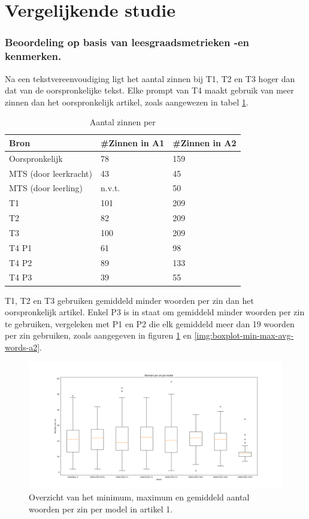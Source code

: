 \section{Vergelijkende studie}

\subsubsection{Beoordeling op basis van leesgraadsmetrieken -en kenmerken.}

Na een tekstvereenvoudiging ligt het aantal zinnen bij T1, T2 en T3 hoger dan dat van de oorspronkelijke tekst. Elke prompt van T4 maakt gebruik van meer zinnen dan het oorspronkelijk artikel, zoals aangewezen in tabel \ref{table:resultaten-aantal-woorden}.

\begin{table}[h]
	\centering
	\begin{tabular}{ | m{3cm} | m{3cm} | m{3cm} | } 
		\hline
		Bron & #Zinnen in A1 & #Zinnen in A2 \\
		\hline
		Oorspronkelijk & 78  & 159 \\ 
		\hline
		MTS (door leerkracht) & 43 & 45 \\
		\hline
		MTS (door leerling) & n.v.t. & 50 \\
		\hline
		T1 & 101 & 209 \\
		\hline
		T2 & 82 & 209 \\
		\hline
		T3 & 100 & 209 \\
		\hline
		T4 P1 & 61 & 98 \\
		\hline
		T4 P2 & 89 & 133 \\
		\hline
		T4 P3 & 39 & 55 \\
		\hline
	\end{tabular}
	\label{table:resultaten-aantal-woorden}
	\caption{Aantal zinnen per }
\end{table}

T1, T2 en T3 gebruiken gemiddeld minder woorden per zin dan het oorspronkelijk artikel. Enkel P3 is in staat om gemiddeld minder woorden per zin te gebruiken, vergeleken met P1 en P2 die elk gemiddeld meer dan 19 woorden per zin gebruiken, zoals aangegeven in figuren \ref{img:boxplot-min-max-avg-words-a1} en \ref{img:boxplot-min-max-avg-words-a2}.

\begin{figure}
	\includegraphics[width=\linewidth]{img/boxplot-avg-a1.png}
	\caption{Overzicht van het minimum, maximum en gemiddeld aantal woorden per zin per model in artikel 1.}
	\label{img:boxplot-min-max-avg-words-a1}
\end{figure}


